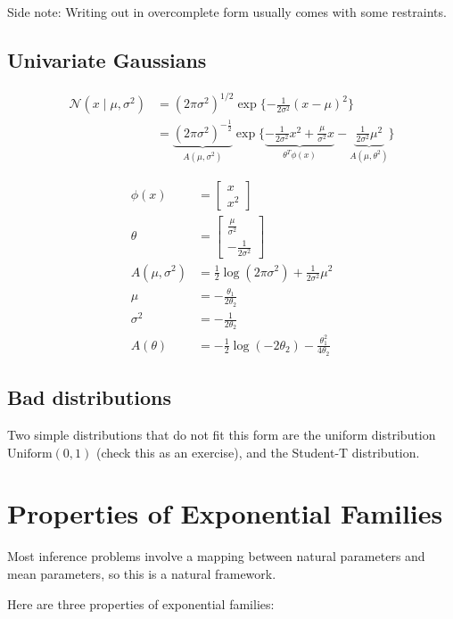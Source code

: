 \documentclass{article}
\begin{document}
Side note: Writing out in overcomplete form usually comes with some restraints.

\subsection{Univariate Gaussians}

\begin{align*}
\mathcal{N} ( x \mid \mu, \sigma^2) &= (2 \pi \sigma^2)^{1/2} \exp \{ -\frac{1}{2\sigma^2} (x - \mu)^2 \} \\
&= \underbrace{(2\pi \sigma^2)^{-\frac{1}{2}}}_{A(\mu, \sigma^2)} \exp\{\underbrace{-\frac{1}{2\sigma^2}x^2 + \frac{\mu}{\sigma^2}x}_{\theta^T \phi(x)} - \underbrace{\frac{1}{2\sigma^2} \mu^2}_{A(\mu, \theta^2)}\}
\end{align*}

\begin{align*}
\phi(x) &= \begin{bmatrix} x \\ x^2 \end{bmatrix} \\
\theta &= \begin{bmatrix} \frac{\mu}{\sigma^2} \\ -\frac{1}{2\sigma^2} \end{bmatrix}\\
A(\mu, \sigma^2) &= \frac{1}{2}\log(2\pi\sigma^2) + \frac{1}{2\sigma^2}\mu^2
\\
\mu &= - \frac{\theta_1}{2\theta_2}
\\
\sigma^2 &= - \frac{1}{2\theta_2}
\\
A(\theta) &= - \frac12 \log( -2 \theta_2) - \frac{\theta_1^2}{4 \theta_2}
\end{align*}

\subsection{Bad distributions}
Two simple distributions that do not fit this form are the uniform distribution $\text{Uniform}(0,1)$ (check this as an exercise), and the Student-T distribution.

\section{Properties of Exponential Families}
Most inference problems involve a mapping between natural parameters and mean parameters, so this is a natural framework. 


Here are three properties of exponential families:
\end{document}

